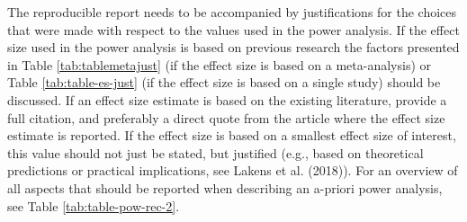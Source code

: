 \documentclass[
  english,
  ,jou, a4paper,floatsintext]{apa6}
\begin{document}
The reproducible report needs to be accompanied by justifications for the choices that were made with respect to the values used in the power analysis. If the effect size used in the power analysis is based on previous research the factors presented in Table \ref{tab:tablemetajust} (if the effect size is based on a meta-analysis) or Table \ref{tab:table-es-just} (if the effect size is based on a single study) should be discussed. If an effect size estimate is based on the existing literature, provide a full citation, and preferably a direct quote from the article where the effect size estimate is reported. If the effect size is based on a smallest effect size of interest, this value should not just be stated, but justified (e.g., based on theoretical predictions or practical implications, see Lakens et al. (2018)). For an overview of all aspects that should be reported when describing an a-priori power analysis, see Table \ref{tab:table-pow-rec-2}.
\end{document}
